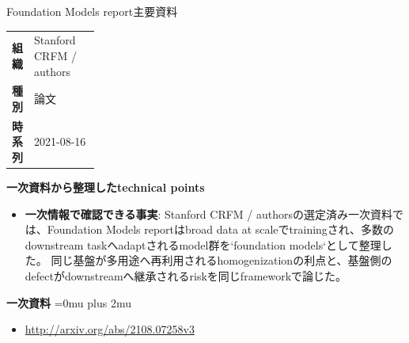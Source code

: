 \begin{technicalnote}{Foundation Models report}{主要資料}
\begingroup
\begin{tabularx}{\linewidth}{@{}>{\bfseries}p{0.22\linewidth}X@{}}
組織 & Stanford CRFM / authors \\
種別 & 論文 \\
時系列 & 2021-08-16 \\
\end{tabularx}
\smallskip
{\bfseries 一次資料から整理したtechnical points}
\begin{itemize}[leftmargin=1.5em,itemsep=0.35em]
\item \textbf{一次情報で確認できる事実}: Stanford CRFM / authorsの選定済み一次資料では、Foundation Models reportはbroad data at scaleでtrainingされ、多数のdownstream taskへadaptされるmodel群を`foundation models`として整理した。 同じ基盤が多用途へ再利用されるhomogenizationの利点と、基盤側のdefectがdownstreamへ継承されるriskを同じframeworkで論じた。
\end{itemize}
\begin{minipage}{\linewidth}
\begin{samepage}
{\bfseries 一次資料}
\begingroup\sloppy
\Urlmuskip=0mu plus 2mu\relax
\begin{itemize}[leftmargin=1.5em,itemsep=0.25em]
\item {\scriptsize\url{http://arxiv.org/abs/2108.07258v3}}
\end{itemize}
\endgroup
\end{samepage}
\end{minipage}
\endgroup
\end{technicalnote}
\medskip


